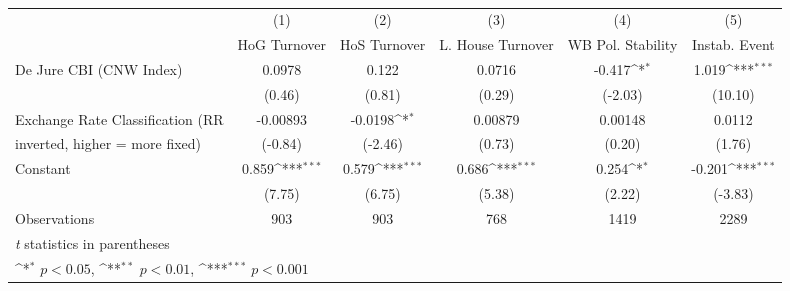\begin{table}[htbp]\centering
\def\sym#1{\ifmmode^{#1}\else\(^{#1}\)\fi}
\caption{\label{democraciesFEDJ}}
\begin{tabular}{l*{5}{c}}
\toprule
                                        &\multicolumn{1}{c}{(1)}&\multicolumn{1}{c}{(2)}&\multicolumn{1}{c}{(3)}&\multicolumn{1}{c}{(4)}&\multicolumn{1}{c}{(5)}\\
                                        &\multicolumn{1}{c}{HoG Turnover}&\multicolumn{1}{c}{HoS Turnover}&\multicolumn{1}{c}{L. House Turnover}&\multicolumn{1}{c}{WB Pol. Stability}&\multicolumn{1}{c}{Instab. Event}\\
\midrule
De Jure CBI (CNW Index)                 &   0.0978         &    0.122         &   0.0716         &   -0.417\sym{*}  &    1.019\sym{***}\\
                                        &   (0.46)         &   (0.81)         &   (0.29)         &  (-2.03)         &  (10.10)         \\
\addlinespace
Exchange Rate Classification (RR        & -0.00893         &  -0.0198\sym{*}  &  0.00879         &  0.00148         &   0.0112         \\
inverted, higher = more fixed)          &  (-0.84)         &  (-2.46)         &   (0.73)         &   (0.20)         &   (1.76)         \\
\addlinespace
Constant                                &    0.859\sym{***}&    0.579\sym{***}&    0.686\sym{***}&    0.254\sym{*}  &   -0.201\sym{***}\\
                                        &   (7.75)         &   (6.75)         &   (5.38)         &   (2.22)         &  (-3.83)         \\
\midrule
Observations                            &      903         &      903         &      768         &     1419         &     2289         \\
\bottomrule
\multicolumn{6}{l}{\footnotesize \textit{t} statistics in parentheses}\\
\multicolumn{6}{l}{\footnotesize \sym{*} \(p<0.05\), \sym{**} \(p<0.01\), \sym{***} \(p<0.001\)}\\
\end{tabular}
\end{table}
